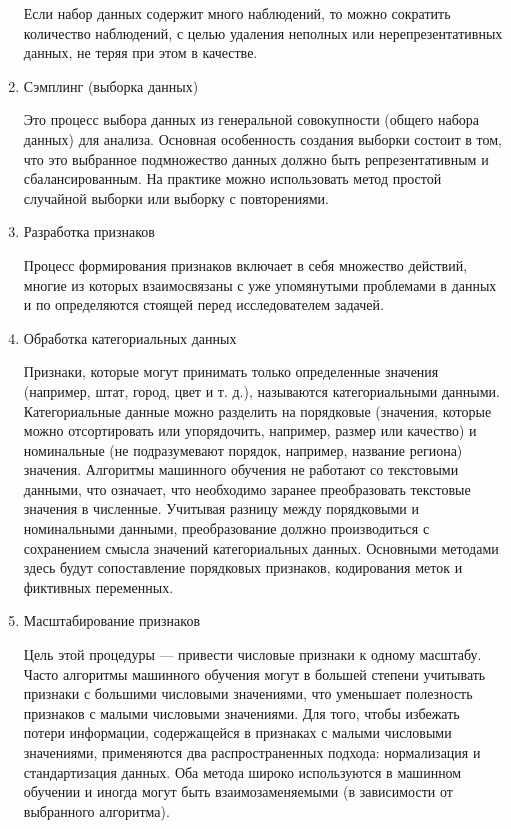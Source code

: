 \documentclass[12pt,a4paper, oneside]{extreport}
\begin{document}
\begin{enumerate}
Если набор данных содержит много наблюдений, то можно сократить  количество наблюдений, с целью  удаления неполных или нерепрезентативных данных,  не  теряя  при этом в качестве. 


\item  Сэмплинг (выборка данных)

Это процесс выбора данных из генеральной совокупности (общего набора данных)  для анализа. Основная особенность создания выборки  состоит в том, что это выбранное подмножество данных должно быть репрезентативным и сбалансированным. На практике можно использовать метод  простой случайной выборки или  выборку с  повторениями.

\item  Разработка признаков 

Процесс формирования признаков включает в себя множество действий, многие  из которых взаимосвязаны с уже упомянутыми проблемами в данных и по определяются стоящей перед исследователем  задачей.

\item  Обработка категориальных данных

Признаки, которые могут принимать только определенные значения (например, штат, город,  цвет и т. д.), называются категориальными данными. Категориальные данные можно разделить на порядковые (значения, которые можно отсортировать или упорядочить, например, размер или качество) и номинальные (не подразумевают порядок, например, название региона) значения. Алгоритмы машинного обучения не работают со текстовыми данными, что означает, что необходимо заранее преобразовать текстовые значения в численные. Учитывая разницу между порядковыми и номинальными данными, преобразование должно производиться с сохранением смысла значений категориальных данных. Основными методами здесь будут сопоставление порядковых признаков, кодирования меток и фиктивных переменных.

\item  Масштабирование признаков

Цель этой процедуры — привести числовые признаки к одному масштабу. Часто алгоритмы машинного обучения могут в большей степени учитывать признаки с большими числовыми значениями, что  уменьшает  полезность признаков с малыми числовыми значениями. Для того, чтобы избежать потери информации, содержащейся в признаках с малыми числовыми значениями, применяются два распространенных подхода: нормализация и стандартизация данных.
Оба метода широко используются в машинном обучении  и иногда могут быть взаимозаменяемыми (в зависимости от выбранного алгоритма).


\end{enumerate}
\end{document}
